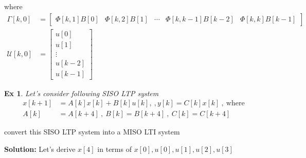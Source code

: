 \documentclass[twoside]{article}
\newtheorem{exmp}[theorem]{Ex}
\begin{document}
%
where
%
\begin{align*}
    \Gamma[k,0] &= \left[ \begin{array}{c|c|c|c|c} \Phi[k,1] B[0] & \Phi[k,2] B[1]  & \cdots & \Phi[k,k-1] B[k-2]  & \Phi[k,k] B[k-1] \end{array} \right]
\\
    \mathcal{U}[k,0] &=  \left[ \begin{array}{c} u[0] \\ u[1] \\ \vdots \\ u[k-2] \\ u[k-1]  \end{array} \right]
\end{align*}
%

\begin{exmp}
Let's consider following SISO LTP system
 \begin{align*}
  x[k+1] &= A[k] x[k] + B[k] u[k] , \ , y[k] = C[k] x[k]  \ , \   \mathrm{where} \\
  A[k] &= A[k+4]  \ , \  B[k] = B[k+4]  \ , \ C[k] = C[k+4]
 \end{align*}
\end{exmp}
%
convert this SISO LTP system into a MISO LTI system

\textbf{Solution:} Let's derive $x[4]$ in terms of $x[0] , u[0] , u[1], u[2] , u[3]$
\end{document}
